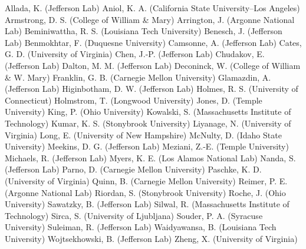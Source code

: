 Allada, K. (Jefferson Lab)
Aniol, K. A. (California State University--Los Angeles)
Armstrong, D. S. (College of William \& Mary)
Arrington, J. (Argonne National Lab)
Beminiwattha, R. S. (Louisiana Tech University)
Benesch, J. (Jefferson Lab)
Benmokhtar, F. (Duquesne University)
Camsonne, A. (Jefferson Lab)
Cates, G. D. (University of Virginia)
Chen, J.-P. (Jefferson Lab)
Chudakov, E. (Jefferson Lab)
Dalton, M. M. (Jefferson Lab)
Deconinck, W. (College of William \& W. Mary)
Franklin, G. B. (Carnegie Mellon University)
Glamazdin, A. (Jefferson Lab)
Higinbotham, D. W. (Jefferson Lab)
Holmes, R. S. (University of Connecticut)
Holmstrom, T. (Longwood University)
Jones, D. (Temple University)
King, P. (Ohio University)
Kowalski, S. (Massachusetts Institute of Technology)
Kumar, K. S. (Stonybrook University)
Liyanage, N. (University of Virginia)
Long, E. (University of New Hampshire)
McNulty, D. (Idaho State University)
Meekins, D. G. (Jefferson Lab)
Meziani, Z.-E. (Temple University)
Michaels, R. (Jefferson Lab)
Myers, K. E. (Los Alamos National Lab)
Nanda, S. (Jefferson Lab)
Parno, D. (Carnegie Mellon University)
Paschke, K. D. (University of Virginia)
Quinn, B. (Carnegie Mellon University)
Reimer, P. E. (Argonne National Lab)
Riordan, S. (Stonybrook University)
Roche, J. (Ohio University)
Sawatzky, B. (Jefferson Lab)
Silwal, R. (Massachusetts Institute of Technology)
Sirca, S. (University of Ljubljana)
Souder, P. A. (Syracuse University)
Suleiman, R. (Jefferson Lab)
Waidyawansa, B. (Louisiana Tech University)
Wojtsekhowski, B. (Jefferson Lab)
Zheng, X. (University of Virginia)
